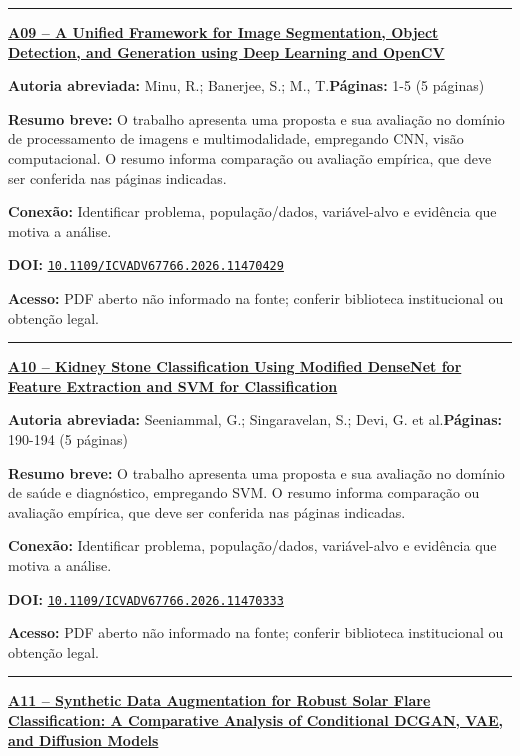 \documentclass[10pt,a4paper]{article}
\begin{document}
\noindent\rule{\textwidth}{0.35pt}
\par\medskip\noindent
{\large\bfseries\href{https://doi.org/10.1109/ICVADV67766.2026.11470429}{A09 -- A Unified Framework for Image Segmentation, Object Detection, and Generation using Deep Learning and OpenCV}}\par\smallskip
\textbf{Autoria abreviada:} Minu, R.; Banerjee, S.; M., T.\quad \textbf{Páginas:} 1-5 (5 páginas)\par
\textbf{Resumo breve:} O trabalho apresenta uma proposta e sua avaliação no domínio de processamento de imagens e multimodalidade, empregando CNN, visão computacional. O resumo informa comparação ou avaliação empírica, que deve ser conferida nas páginas indicadas.\par
\textbf{Conexão:} Identificar problema, população/dados, variável-alvo e evidência que motiva a análise.\par
\textbf{DOI:} \href{https://doi.org/10.1109/ICVADV67766.2026.11470429}{\nolinkurl{10.1109/ICVADV67766.2026.11470429}}\par
\textbf{Acesso:} PDF aberto não informado na fonte; conferir biblioteca institucional ou obtenção legal.\par
\noindent\rule{\textwidth}{0.35pt}
\par\medskip\noindent
{\large\bfseries\href{https://doi.org/10.1109/ICVADV67766.2026.11470333}{A10 -- Kidney Stone Classification Using Modified DenseNet for Feature Extraction and SVM for Classification}}\par\smallskip
\textbf{Autoria abreviada:} Seeniammal, G.; Singaravelan, S.; Devi, G. et al.\quad \textbf{Páginas:} 190-194 (5 páginas)\par
\textbf{Resumo breve:} O trabalho apresenta uma proposta e sua avaliação no domínio de saúde e diagnóstico, empregando SVM. O resumo informa comparação ou avaliação empírica, que deve ser conferida nas páginas indicadas.\par
\textbf{Conexão:} Identificar problema, população/dados, variável-alvo e evidência que motiva a análise.\par
\textbf{DOI:} \href{https://doi.org/10.1109/ICVADV67766.2026.11470333}{\nolinkurl{10.1109/ICVADV67766.2026.11470333}}\par
\textbf{Acesso:} PDF aberto não informado na fonte; conferir biblioteca institucional ou obtenção legal.\par
\noindent\rule{\textwidth}{0.35pt}
\par\medskip\noindent
{\large\bfseries\href{https://doi.org/10.1109/ICVADV67766.2026.11470543}{A11 -- Synthetic Data Augmentation for Robust Solar Flare Classification: A Comparative Analysis of Conditional DCGAN, VAE, and Diffusion Models}}\par\smallskip
\end{document}
